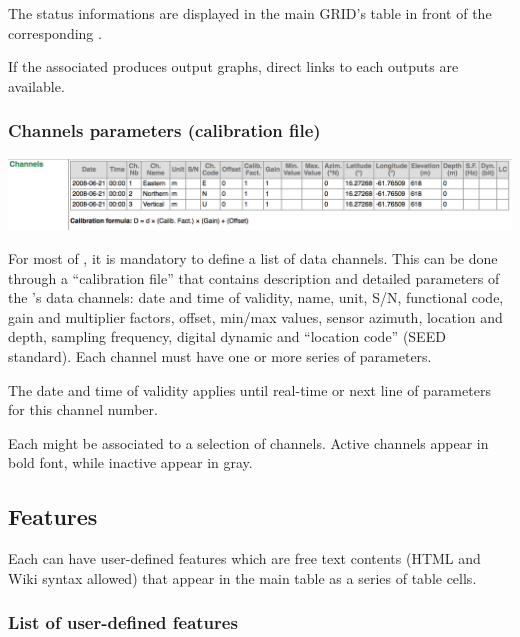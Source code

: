 The status informations are displayed in the main GRID's table in front of the corresponding .

If the associated  produces output graphs, direct links to each outputs are available.


\subsubsection{Channels parameters (calibration file)}
\label{clb}

\includegraphics[width=\textwidth]{figures/CLB_table.png}

For most of , it is mandatory to define a list of data channels. This can be done through a ``calibration file'' that contains description and detailed parameters of the 's data channels: date and time of validity, name, unit, S/N, functional code, gain and multiplier factors, offset, min/max values, sensor azimuth, location and depth, sampling frequency, digital dynamic and ``location code'' (SEED standard). Each channel must have one or more series of parameters. 

The date and time of validity applies until real-time or next line of parameters for this channel number.

Each  might be associated to a selection of channels. Active channels appear in bold font, while inactive appear in gray.

\subsection{Features}

Each  can have user-defined features which are free text contents (HTML and Wiki syntax allowed) that appear in the main table as a series of table cells.

\subsubsection{List of user-defined features}

